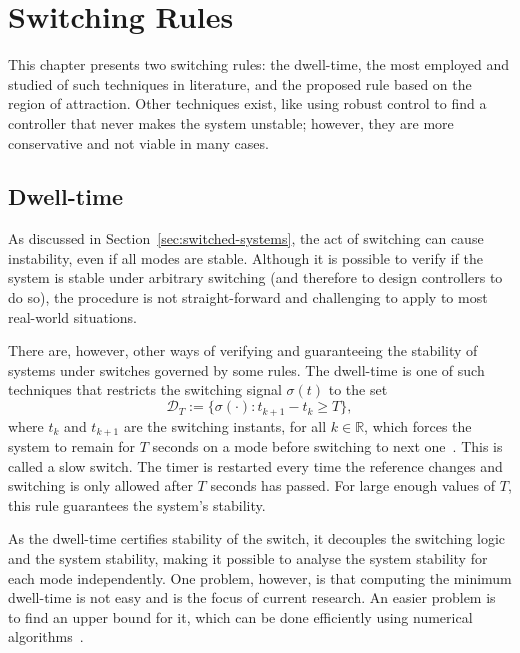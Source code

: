 
\chapter{Switching Rules}%
\label{chp:switching-rules}

This chapter presents two switching rules: the dwell-time, the most employed and
studied of such techniques in literature, and the proposed rule based on the
region of attraction. Other techniques exist, like using robust control to find
a controller that never makes the system unstable; however, they are more
conservative and not viable in many cases.

\section{Dwell-time}%
\label{sec:dwell-time}

As discussed in Section~\ref{sec:switched-systems}, the act of switching can
cause instability, even if all modes are stable. Although it is possible to
verify if the system is stable under arbitrary switching (and therefore to
design controllers to do so), the procedure is not straight-forward and
challenging to apply to most real-world situations.

There are, however, other ways of verifying and guaranteeing the stability of
systems under switches governed by some rules. The dwell-time is one of such
techniques that restricts the switching signal \(\sigma{}(t)\) to the set
%
\begin{equation}
  \mathcal{D}_{T} := \{\sigma(\cdot):t_{k+1}-t_{k}\ge{}T\},
\end{equation}
%
where \(t_{k}\) and \(t_{k+1}\) are the switching instants, for all
\(k\in{}\mathbb{R}\), which forces the system to remain for \(T\) seconds on a
mode before switching to next one~\parencite{colaneri:dwell}. This is called a
slow switch. The timer is restarted every time the reference changes and
switching is only allowed after \(T\) seconds has passed. For large enough
values of \(T\), this rule guarantees the system's stability.

As the dwell-time certifies stability of the switch, it decouples the switching
logic and the system stability, making it possible to analyse the system
stability for each mode independently. One problem, however, is that computing
the minimum dwell-time is not easy and is the focus of current research. An
easier problem is to find an upper bound for it, which can be done efficiently
using numerical algorithms~\parencite{colaneri:dwell}.

